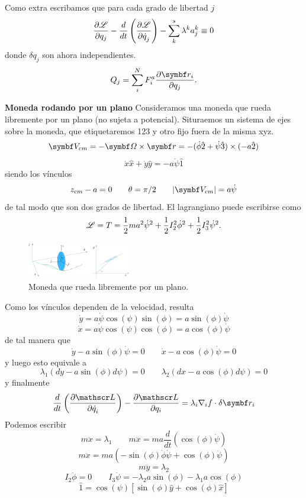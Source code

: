\documentclass[10pt,oneside]{CBFT_book}
\begin{document}
Como extra escribamos que para cada grado de libertad $j$ 
\[
	\frac{\partial^{\hspace{-0.05em}} {\mathscr{L}}}{\partial {q_j}^{\hspace{-0.05em}}} - \frac{d}{dt}\left( \frac{\partial^{\hspace{-0.05em}} {\mathscr{L}}}{\partial {\dot{q}_j}^{\hspace{-0.05em}}} \right) - \sum_k^s \lambda^k a_j^k \equiv 0
\]
donde $\delta q_j$ son ahora independientes.
\[
	Q_j = \sum_i^N F_i^a \dpar{\vb{r}_i}{q_j}. 
\]

\begin{ejemplo}{\bf Moneda rodando por un plano}
Consideramos una moneda que rueda libremente por un plano (no sujeta a potencial).
Situraemos un sistema de ejes sobre la moneda, que etiquetaremos 123 y otro fijo fuera
de la misma xyz.
\[
	\vb{V}_{cm} = -\vb{\Omega} \times \vb{r} =
	-(\dot{\phi}\hat{2} + \dot{\psi}\hat{3}) \times (-a\hat{2})
\]
\[
	\dot{x}\hat{x} + \dot{y}\hat{y} = -a \dot{\psi}\hat{1}
\]
siendo los vínculos
\[
	z_{cm} - a = 0 \qquad \theta=\pi/2 \qquad |\vb{V}_{cm}| = a\dot{\psi}
\]
de tal modo que son dos grados de libertad. El lagrangiano puede escribirse como 
\[
	\mathscr{L} = T = \frac{1}{2}m a^2 \dot{\psi}^2  + \frac{1}{2} I_2^2 \dot{\phi}^2 + \frac{1}{2} I_3^2\dot{\psi}^2.
\]

\begin{figure}
	\begin{center}
	\includegraphics[width=0.4\textwidth]{images/fig_moneda.pdf}	 
	\end{center}
	\caption{Moneda que rueda libremente por un plano.}
\end{figure} 

Como los vínculos dependen de la velocidad, resulta 
\[
	\dot{y} = a\dot{\psi} \cos(\psi) \sin(\phi) = a \sin(\phi) \dot{\psi}
\]
\[
	\dot{x} = a\dot{\psi} \cos(\psi) \cos(\phi) = a \cos(\phi) \dot{\psi}
\]
de tal manera que 
\[
	\dot{y} - a \sin(\phi) \dot{\psi} = 0 \qquad \dot{x} - a \cos(\phi) \dot{\psi} = 0
\]
y luego esto equivale a 
\[
	\lambda_1(dy - a \sin(\phi) d\psi) = 0 \qquad \lambda_2(dx - a \cos(\phi) d\psi)= 0
\]
y finalmente 
\[
	\frac{d}{dt}\left(\dpar{\Lag}{\dot{q}_i}\right) - \dpar{\Lag}{q_i} =
	\lambda_i \nabla_i f \cdot \delta \vb{r}_i
\]
Podemos escribir
\[
	m \ddot{x} = \lambda_1 \qquad m \ddot{x} = m a \frac{d}{dt}( \cos(\phi)\dot{\psi} )
\]
\[
	m \ddot{x} = m a ( -\sin(\phi)\dot{\phi}\dot{\psi} + \cos(\phi)\ddot{\psi} )
\]
\[
	m \ddot{y} = \lambda_2
\]
\[
	I_2\ddot{\phi} = 0 \qquad I_3\ddot{\psi} = - \lambda_2 a \sin(\phi) -\lambda_1 a \cos(\phi)
\]
\[
	\hat{1} = \cos(\psi)[\sin(\phi)\hat{y} + \cos(\phi)\hat{x}]
\]

\label{moneda}
\end{ejemplo}
\end{document}
